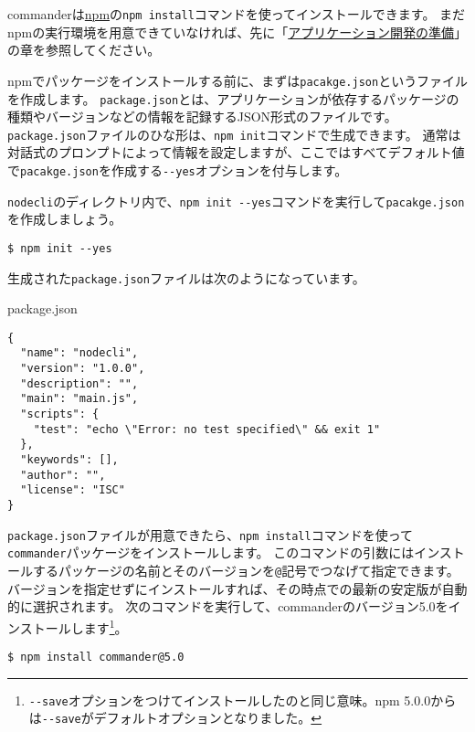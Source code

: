 commanderは\href{https://www.npmjs.com/}{npm}の\texttt{npm install}コマンドを使ってインストールできます。
まだnpmの実行環境を用意できていなければ、先に「\hyperlink{setup-local-env}{アプリケーション開発の準備}」の章を参照してください。

npmでパッケージをインストールする前に、まずは\texttt{pacakge.json}というファイルを作成します。
\texttt{package.json}とは、アプリケーションが依存するパッケージの種類やバージョンなどの情報を記録するJSON形式のファイルです。
\texttt{package.json}ファイルのひな形は、\texttt{npm init}コマンドで生成できます。
通常は対話式のプロンプトによって情報を設定しますが、ここではすべてデフォルト値で\texttt{pacakge.json}を作成する\texttt{-\/-yes}オプションを付与します。

\texttt{nodecli}のディレクトリ内で、\texttt{npm init -\/-yes}コマンドを実行して\texttt{pacakge.json}を作成しましょう。

\begin{lstlisting}
$ npm init --yes
\end{lstlisting}

生成された\texttt{package.json}ファイルは次のようになっています。

\begin{listtitle}
package.json
\end{listtitle}
\begin{lstlisting}
{
  "name": "nodecli",
  "version": "1.0.0",
  "description": "",
  "main": "main.js",
  "scripts": {
    "test": "echo \"Error: no test specified\" && exit 1"
  },
  "keywords": [],
  "author": "",
  "license": "ISC"
}
\end{lstlisting}
\listend

\texttt{package.json}ファイルが用意できたら、\texttt{npm install}コマンドを使って\texttt{commander}パッケージをインストールします。
このコマンドの引数にはインストールするパッケージの名前とそのバージョンを\texttt{@}記号でつなげて指定できます。
バージョンを指定せずにインストールすれば、その時点での最新の安定版が自動的に選択されます。
次のコマンドを実行して、commanderのバージョン5.0をインストールします\footnote{\texttt{-\/-save}オプションをつけてインストールしたのと同じ意味。npm
  5.0.0からは\texttt{-\/-save}がデフォルトオプションとなりました。}。

\begin{lstlisting}
$ npm install commander@5.0
\end{lstlisting}

